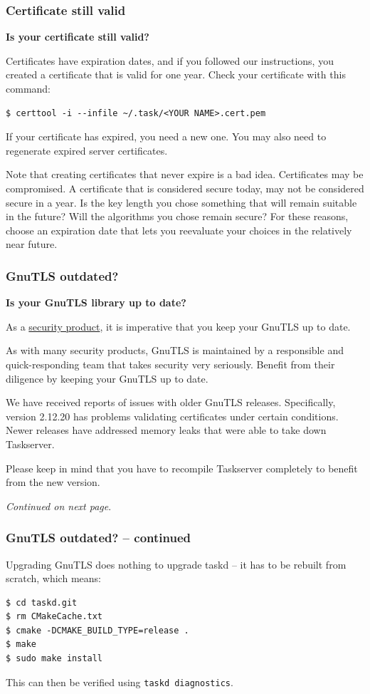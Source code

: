 \documentclass[t,handout]{beamer}
\begin{document}
\begin{frame}[fragile]\frametitle{Certificate still valid}
    \textbf{Is your certificate still valid?}

    Certificates have expiration dates, and if you followed our instructions, you created a certificate that is valid for one year.  Check your certificate with this command:

    \begin{lstlisting}
$ certtool -i --infile ~/.task/<YOUR NAME>.cert.pem\end{lstlisting}

    If your certificate has expired, you need a new one.  You may also need to regenerate expired server certificates.

    Note that creating certificates that never expire is a bad idea. Certificates may be compromised. A certificate that is considered secure today, may not be considered secure in a year. Is the key length you chose something that will remain suitable in the future? Will the algorithms you          chose remain secure? For these reasons, choose an expiration date that lets you reevaluate your choices in the relatively near future.
\end{frame}

\begin{frame}[fragile]\frametitle{GnuTLS outdated?}\label{gnutlsproblem}
    \textbf{Is your GnuTLS library up to date?}

    As a \href{http://gnutls.org/security.html}{security product}, it is imperative that you keep your GnuTLS up to date.

    As with many security products, GnuTLS is maintained by a responsible and quick-responding team that takes security very seriously.  Benefit from their diligence by keeping your GnuTLS up to date.

    We have received reports of issues with older GnuTLS releases. Specifically, version 2.12.20 has problems validating certificates under certain conditions. Newer releases have addressed memory leaks that were able to take down Taskserver.

    Please keep in mind that you have to recompile Taskserver completely to benefit from the new version.

    \emph{Continued on next page}.
\end{frame}

\begin{frame}[fragile]\frametitle{GnuTLS outdated? -- continued}
    Upgrading GnuTLS does nothing to upgrade taskd -- it has to be rebuilt from scratch, which means:

    \begin{lstlisting}
$ cd taskd.git
$ rm CMakeCache.txt
$ cmake -DCMAKE_BUILD_TYPE=release .
$ make
$ sudo make install\end{lstlisting}

    This can then be verified using \verb+taskd diagnostics+.
\end{frame}
\end{document}
